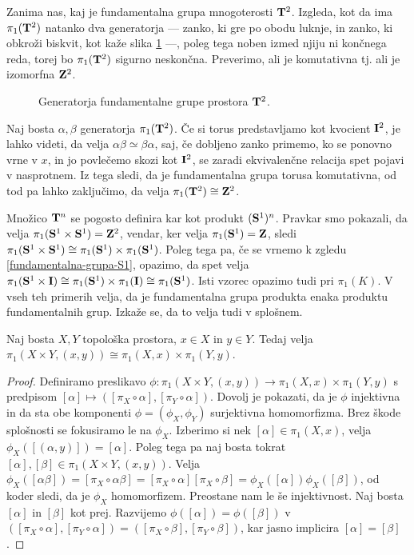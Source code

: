 \documentclass[11pt, a4paper]{article}
\begin{document}
\begin{zgled}
    Zanima nas, kaj je fundamentalna grupa mnogoterosti $\T^2$. Izgleda, kot da ima $\pi_1(\T^2)$ natanko dva generatorja — zanko, ki gre po obodu luknje, in zanko, ki obkroži biskvit, kot kaže slika \ref{krof} —, poleg tega noben izmed njiju ni končnega reda, torej bo $\pi_1(\T^2)$ sigurno neskončna. Preverimo, ali je komutativna tj. ali je izomorfna $\Z^2$.

    \begin{figure}[H]
        \centering
        
        \caption{Generatorja fundamentalne grupe prostora $\T^2$.}
        \label{krof}
    \end{figure}

    Naj bosta $\alpha, \beta$ generatorja $\pi_1(\T^2)$. Če si torus predstavljamo kot kvocient $\I^2$, je lahko videti, da velja $\alpha\beta \simeq \beta\alpha$, saj, če dobljeno zanko primemo, ko se ponovno vrne v $x$, in jo povlečemo skozi kot $\I^2$, se zaradi ekvivalenčne relacija spet pojavi v nasprotnem. Iz tega sledi, da je fundamentalna grupa torusa komutativna, od tod pa lahko zaključimo, da velja $\pi_1(\T^2) \cong \Z^2$.
\end{zgled}


Množico $\T^n$ se pogosto definira kar kot produkt $(\S^1)^n$. Pravkar smo pokazali, da velja $\pi_1(\S^1 \times \S^1) = \Z^2$, vendar, ker velja $\pi_1(\S^1) = \Z$, sledi $\pi_1(\S^1 \times \S^1) \cong \pi_1(\S^1) \times \pi_1(\S^1)$. Poleg tega pa, če se vrnemo k zgledu \ref{fundamentalna-grupa-S1}, opazimo, da spet velja $\pi_1(\S^1 \times \I) \cong \pi_1(\S^1) \times \pi_1(\I) \cong \pi_1(\S^1)$. Isti vzorec opazimo tudi pri $\pi_1(K)$. V vseh teh primerih velja, da je fundamentalna grupa produkta enaka produktu fundamentalnih grup. Izkaže se, da to velja tudi v splošnem.


\begin{trditev}
    Naj bosta $X, Y$ topološka prostora, $x \in X$ in $y \in Y$. Tedaj velja $\pi_1(X \times Y, (x, y)) \cong \pi_1(X, x) \times \pi_1(Y, y)$.
\end{trditev}


\begin{proof}
    Definiramo preslikavo $\phi : \pi_1(X \times Y, (x, y)) \to \pi_1(X, x) \times \pi_1(Y, y)$ s predpisom $[\alpha] \mapsto ([\pi_X \circ \alpha], [\pi_Y \circ \alpha])$. Dovolj je pokazati, da je $\phi$ injektivna in da sta obe komponenti $\phi = (\phi_X, \phi_Y)$ surjektivna homomorfizma. Brez škode splošnosti se fokusiramo le na $\phi_X$. Izberimo si nek $[\alpha] \in \pi_1(X, x)$, velja $\phi_X([(\alpha, y)]) = [\alpha]$. Poleg tega pa naj bosta tokrat $[\alpha], [\beta] \in \pi_1(X \times Y, (x, y))$. Velja $\phi_X([\alpha\beta]) = [\pi_X \circ \alpha\beta] = [\pi_X \circ \alpha][\pi_X \circ \beta] = \phi_X([\alpha])\phi_X([\beta])$, od koder sledi, da je $\phi_X$ homomorfizem. Preostane nam le še injektivnost. Naj bosta $[\alpha]$ in $[\beta]$ kot prej. Razvijemo $\phi([\alpha]) = \phi([\beta])$ v $([\pi_X \circ \alpha], [\pi_Y \circ \alpha]) = ([\pi_X \circ \beta], [\pi_Y \circ \beta])$, kar jasno implicira $[\alpha] = [\beta]$.
\end{proof}
\end{document}
